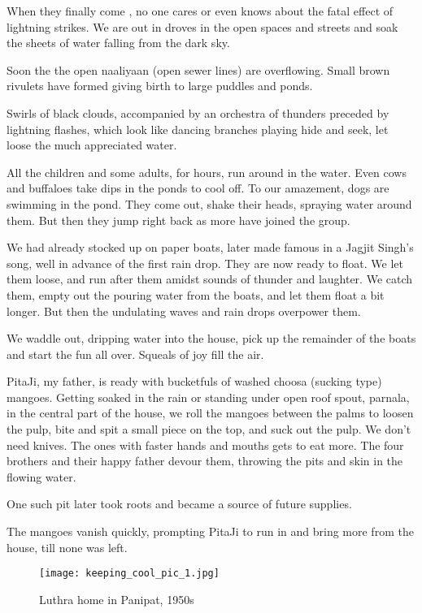 When they finally come , no one cares or even knows about the fatal effect
of lightning strikes. We are out in droves in the open spaces and streets
and soak the sheets of water falling from the dark sky.
 
Soon the the open naaliyaan (open sewer lines) are overflowing. Small
brown rivulets have formed giving birth to large puddles and ponds. 

Swirls of black clouds, accompanied by an orchestra of thunders preceded
by lightning flashes, which look like dancing branches playing hide and
seek, let loose the much appreciated water. 

All the children and some adults, for hours, run around in the water. Even
cows and buffaloes take dips in the ponds to cool off. To our amazement,
dogs are swimming in the pond. They come out, shake their heads, spraying
water around them. But then they jump right back as more have joined the
group. 
 
We had already stocked up on paper boats, later made famous in a Jagjit
Singh’s song, well in advance of the first rain drop. They are now ready
to float. We let them loose, and run after them amidst sounds of thunder
and laughter. We catch them, empty out the pouring water from the boats,
and let them float a bit longer. But then the undulating waves and rain
drops overpower them. 

We waddle out, dripping water into the house, pick up the remainder of the
boats and start the fun all over. Squeals of joy fill the air. 
 
PitaJi, my father, is ready with bucketfuls of washed choosa (sucking
type) mangoes. Getting soaked in the rain or standing under open roof
spout, parnala, in the central part of the house, we roll the mangoes
between the palms to loosen the pulp, bite and spit a small piece on the
top, and suck out the pulp. We don’t need knives. The ones with faster
hands and mouths gets to eat more. The four brothers and their happy
father devour them, throwing the pits and skin in the flowing water. 

One such pit later took roots and became a source of future supplies. 

The mangoes vanish quickly, prompting PitaJi to run in and bring more from
the house, till none was left. 
 
\begin{figure}
\texttt{[image: keeping\_cool\_pic\_1.jpg]}
\caption{Luthra home in Panipat, 1950s} \end{figure}


